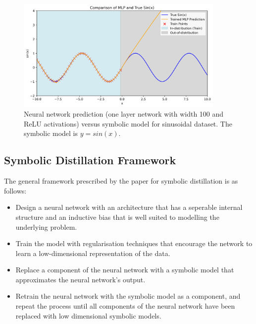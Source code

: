 \documentclass[11pt]{article}
\begin{document}
\begin{figure}[H]
    \centering
    \includegraphics[width=0.9\textwidth]{figs/analytic_vs_nn_inductive_bias.png}
    \caption{Neural network prediction (one layer network with width 100 and ReLU activations)  versus symbolic model for sinusoidal dataset. The symbolic model is $y = sin(x)$.}
    \label{fig:nn_vs_sym_sin}
\end{figure}

\subsection{Symbolic Distillation Framework}
The general framework prescribed by the paper for symbolic distillation is as follows:
\begin{itemize}
    \item Design a neural network with an architecture that has a seperable internal structure and an inductive bias that is well suited to modelling the underlying problem.
    \item Train the model with regularisation techniques that encourage the network to learn a low-dimensional representation of the data.
    \item Replace a component of the neural network with a symbolic model that approximates the neural network's output.
    \item Retrain the neural network with the symbolic model as a component, and repeat the process until all components of the neural network have been replaced with low dimensional symbolic models.
\end{itemize}
\end{document}
